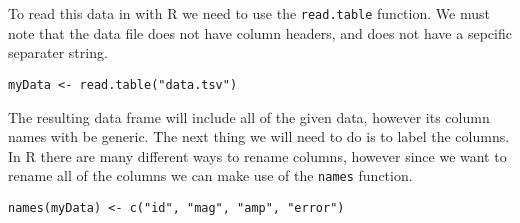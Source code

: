 To read this data in with R we need to use the \verb|read.table| function. We must note that the data file does not have column headers, and does not have a sepcific separater string.

\begin{verbatim}
myData <- read.table("data.tsv")
\end{verbatim}

The resulting data frame will include all of the given data, however its column names with be generic. The next thing we will need to do is to label the columns. In R there are many different ways to rename columns, however since we want to rename all of the columns we can make use of the \verb|names| function.

\begin{verbatim}
names(myData) <- c("id", "mag", "amp", "error")
\end{verbatim}